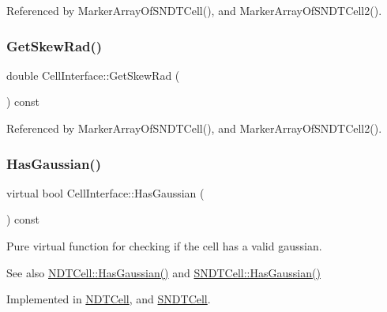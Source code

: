 Referenced by Marker\+Array\+Of\+S\+N\+D\+T\+Cell(), and Marker\+Array\+Of\+S\+N\+D\+T\+Cell2().

\mbox{\label{classCellInterface_a4d88613aaecc01f7e21b4efd9e554e95}} 
\subsubsection{\texorpdfstring{Get\+Skew\+Rad()}{GetSkewRad()}}
{\footnotesize\ttfamily double Cell\+Interface\+::\+Get\+Skew\+Rad (\begin{DoxyParamCaption}{ }\end{DoxyParamCaption}) const\hspace{0.3cm}{\ttfamily [inline]}}



Referenced by Marker\+Array\+Of\+S\+N\+D\+T\+Cell(), and Marker\+Array\+Of\+S\+N\+D\+T\+Cell2().

\mbox{\label{classCellInterface_a4fde95ddb0950dc41ee77dfdeb90928b}} 
\subsubsection{\texorpdfstring{Has\+Gaussian()}{HasGaussian()}}
{\footnotesize\ttfamily virtual bool Cell\+Interface\+::\+Has\+Gaussian (\begin{DoxyParamCaption}{ }\end{DoxyParamCaption}) const\hspace{0.3cm}{\ttfamily [pure virtual]}}



Pure virtual function for checking if the cell has a valid gaussian. 

\begin{DoxySeeAlso}{See also}
\hyperlink{classNDTCell_abe1ad036f849e989f9f32f2b7c27530e}{N\+D\+T\+Cell\+::\+Has\+Gaussian()} and \hyperlink{classSNDTCell_ababb27a2efdb0537d5bb29cec36b82f4}{S\+N\+D\+T\+Cell\+::\+Has\+Gaussian()} 
\end{DoxySeeAlso}


Implemented in \hyperlink{classNDTCell_abe1ad036f849e989f9f32f2b7c27530e}{N\+D\+T\+Cell}, and \hyperlink{classSNDTCell_ababb27a2efdb0537d5bb29cec36b82f4}{S\+N\+D\+T\+Cell}.




